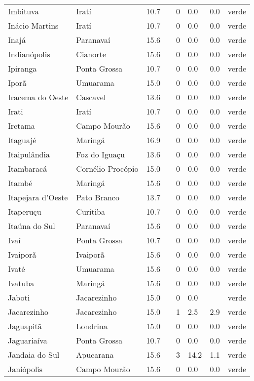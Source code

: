 \begin{longtable}{l|lllllll}
  Imbituva & Iratí & 10.7 &  & 0 & 0.0 & 0.0 & verde \\ 
  Inácio Martins & Iratí & 10.7 &  & 0 & 0.0 & 0.0 & verde \\ 
  Inajá & Paranavaí & 15.6 &  & 0 & 0.0 & 0.0 & verde \\ 
  Indianópolis & Cianorte & 15.6 &  & 0 & 0.0 & 0.0 & verde \\ 
  Ipiranga & Ponta Grossa & 10.7 &  & 0 & 0.0 & 0.0 & verde \\ 
  Iporã & Umuarama & 15.0 &  & 0 & 0.0 & 0.0 & verde \\ 
  Iracema do Oeste & Cascavel & 13.6 &  & 0 & 0.0 & 0.0 & verde \\ 
  Irati & Iratí & 10.7 &  & 0 & 0.0 & 0.0 & verde \\ 
  Iretama & Campo Mourão & 15.6 &  & 0 & 0.0 & 0.0 & verde \\ 
  Itaguajé & Maringá & 16.9 &  & 0 & 0.0 & 0.0 & verde \\ 
  Itaipulândia & Foz do Iguaçu & 13.6 &  & 0 & 0.0 & 0.0 & verde \\ 
  Itambaracá & Cornélio Procópio & 15.0 &  & 0 & 0.0 & 0.0 & verde \\ 
  Itambé & Maringá & 15.6 &  & 0 & 0.0 & 0.0 & verde \\ 
  Itapejara d'Oeste & Pato Branco & 13.7 &  & 0 & 0.0 & 0.0 & verde \\ 
  Itaperuçu & Curitiba & 10.7 &  & 0 & 0.0 & 0.0 & verde \\ 
  Itaúna do Sul & Paranavaí & 15.6 &  & 0 & 0.0 & 0.0 & verde \\ 
  Ivaí & Ponta Grossa & 10.7 &  & 0 & 0.0 & 0.0 & verde \\ 
  Ivaiporã & Ivaiporã & 15.6 &  & 0 & 0.0 & 0.0 & verde \\ 
  Ivaté & Umuarama & 15.6 &  & 0 & 0.0 & 0.0 & verde \\ 
  Ivatuba & Maringá & 15.6 &  & 0 & 0.0 & 0.0 & verde \\ 
  Jaboti & Jacarezinho & 15.0 &  & 0 & 0.0 &  & verde \\ 
  Jacarezinho & Jacarezinho & 15.0 &  & 1 & 2.5 & 2.9 & verde \\ 
  Jaguapitã & Londrina & 15.0 &  & 0 & 0.0 & 0.0 & verde \\ 
  Jaguariaíva & Ponta Grossa & 10.7 &  & 0 & 0.0 & 0.0 & verde \\ 
  Jandaia do Sul & Apucarana & 15.6 &  & 3 & 14.2 & 1.1 & verde \\ 
  Janiópolis & Campo Mourão & 15.6 &  & 0 & 0.0 & 0.0 & verde \\ 

\end{longtable}
